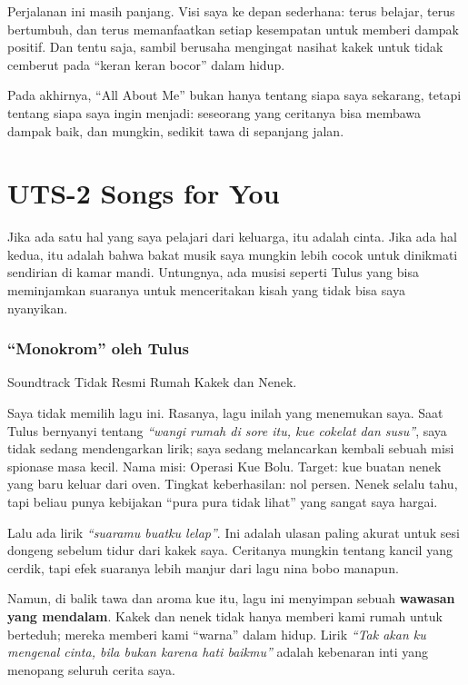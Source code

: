 \documentclass[
  letterpaper,
  DIV=11,
  numbers=noendperiod]{scrreprt}
\begin{document}
Perjalanan ini masih panjang. Visi saya ke depan sederhana: terus
belajar, terus bertumbuh, dan terus memanfaatkan setiap kesempatan untuk
memberi dampak positif. Dan tentu saja, sambil berusaha mengingat
nasihat kakek untuk tidak cemberut pada ``keran keran bocor'' dalam
hidup.

Pada akhirnya, ``All About Me'' bukan hanya tentang siapa saya sekarang,
tetapi tentang siapa saya ingin menjadi: seseorang yang ceritanya bisa
membawa dampak baik, dan mungkin, sedikit tawa di sepanjang jalan.


\chapter{UTS-2 Songs for You}\label{uts-2-songs-for-you}

Jika ada satu hal yang saya pelajari dari keluarga, itu adalah cinta.
Jika ada hal kedua, itu adalah bahwa bakat musik saya mungkin lebih
cocok untuk dinikmati sendirian di kamar mandi. Untungnya, ada musisi
seperti Tulus yang bisa meminjamkan suaranya untuk menceritakan kisah
yang tidak bisa saya nyanyikan.

\subsection{``Monokrom'' oleh Tulus}\label{monokrom-oleh-tulus}

Soundtrack Tidak Resmi Rumah Kakek dan Nenek.

Saya tidak memilih lagu ini. Rasanya, lagu inilah yang menemukan saya.
Saat Tulus bernyanyi tentang \emph{``wangi rumah di sore itu, kue
cokelat dan susu''}, saya tidak sedang mendengarkan lirik; saya sedang
melancarkan kembali sebuah misi spionase masa kecil. Nama misi: Operasi
Kue Bolu. Target: kue buatan nenek yang baru keluar dari oven. Tingkat
keberhasilan: nol persen. Nenek selalu tahu, tapi beliau punya kebijakan
``pura pura tidak lihat'' yang sangat saya hargai.

Lalu ada lirik \emph{``suaramu buatku lelap''}. Ini adalah ulasan paling
akurat untuk sesi dongeng sebelum tidur dari kakek saya. Ceritanya
mungkin tentang kancil yang cerdik, tapi efek suaranya lebih manjur dari
lagu nina bobo manapun.

Namun, di balik tawa dan aroma kue itu, lagu ini menyimpan sebuah
\textbf{wawasan yang mendalam}. Kakek dan nenek tidak hanya memberi kami
rumah untuk berteduh; mereka memberi kami ``warna'' dalam hidup. Lirik
\emph{``Tak akan ku mengenal cinta, bila bukan karena hati baikmu''}
adalah kebenaran inti yang menopang seluruh cerita saya.
\end{document}
